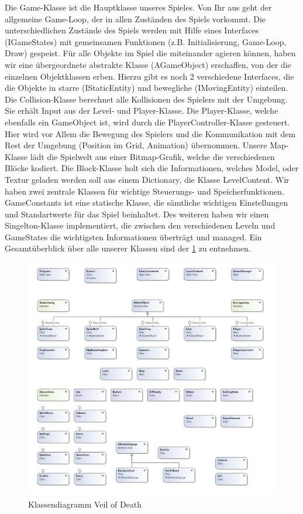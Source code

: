 \documentclass{article}
\begin{document}
Die Game-Klasse ist die Hauptklasse unseres Spieles. Von Ihr aus geht der allgemeine Game-Loop, der in allen Zuständen des Spiels vorkommt. Die unterschiedlichen Zustände des Spiels werden mit Hilfe eines Interfaces (IGameStates) mit gemeinsamen Funktionen (z.B. Initialisierung, Game-Loop, Draw) gespeist.
Für alle Objekte im Spiel die miteinander agieren können, haben wir eine übergeordnete abstrakte Klasse (AGameObject) erschaffen, von der die einzelnen Objektklassen erben.
Hierzu gibt es noch 2 verschiedene Interfaces, die die Objekte in starre (IStaticEntity) und bewegliche (IMovingEntity) einteilen.
Die Collision-Klasse berechnet alle Kollisionen des Spielers mit der Umgebung. Sie erhält Input
aus der Level- und Player-Klasse.
Die Player-Klasse, welche ebenfalls ein GameObject ist, wird durch die PlayerController-Klasse
gesteuert. Hier wird vor Allem die Bewegung des Spielers und die Kommunikation mit dem Rest der Umgebung (Position im Grid, Animation) übernommen.
Unsere Map-Klasse lädt die Spielwelt aus einer Bitmap-Grafik, welche die verschiedenen Blöcke kodiert.
Die Block-Klasse holt sich die Informationen, welches Model, oder Textur geladen werden soll aus einem Dictionary, die Klasse LevelContent.
Wir haben zwei zentrale Klassen für wichtige Steuerungs- und Speicherfunktionen. GameConstants ist eine statische Klasse, die sämtliche wichtigen Einstellungen und Standartwerte für das Spiel beinhaltet. Des weiteren haben wir einen Singelton-Klasse implementiert, die zwischen den verschiedenen Leveln und GameStates die wichtigsten Informationen überträgt und managed.
Ein Gesamtüberblick über alle unserer Klassen sind der \ref{fig:classdiagramm} zu entnehmen.

\begin{figure}
	\centering
	\includegraphics[width=1\textwidth]{classdiagramm.png}
	\caption{Klassendiagramm Veil of Death
		\label{fig:classdiagramm}}
\end{figure}
\end{document}
